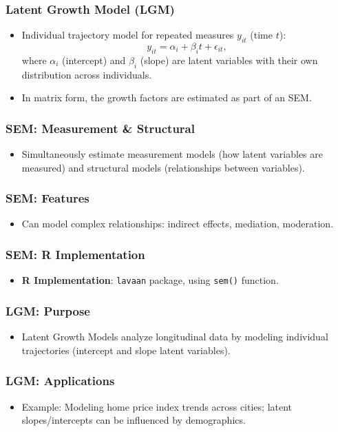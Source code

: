 \documentclass{beamer}
\newcommand{\code}[1]{\texttt{#1}}
\begin{document}
\begin{frame}
    \frametitle{Latent Growth Model (LGM)}
    \begin{itemize}
        \item Individual trajectory model for repeated measures $y_{it}$ (time $t$):
        \[y_{it}=\alpha_i+\beta_i t+\epsilon_{it},\]
        where $\alpha_i$ (intercept) and $\beta_i$ (slope) are latent variables with their own distribution across individuals.
        \item In matrix form, the growth factors are estimated as part of an SEM.
    \end{itemize}
\end{frame}

\begin{frame}
    \frametitle{SEM: Measurement \& Structural}
    \begin{itemize}
        \item Simultaneously estimate measurement models (how latent variables are measured) and structural models (relationships between variables).
    \end{itemize}
\end{frame}

\begin{frame}
    \frametitle{SEM: Features}
    \begin{itemize}
        \item Can model complex relationships: indirect effects, mediation, moderation.
    \end{itemize}
\end{frame}

\begin{frame}
    \frametitle{SEM: R Implementation}
    \begin{itemize}
        \item \textbf{R Implementation}: \code{lavaan} package, using \code{sem()} function.
    \end{itemize}
\end{frame}

\begin{frame}
    \frametitle{LGM: Purpose}
    \begin{itemize}
        \item Latent Growth Models analyze longitudinal data by modeling individual trajectories (intercept and slope latent variables).
    \end{itemize}
\end{frame}

\begin{frame}
    \frametitle{LGM: Applications}
    \begin{itemize}
        \item Example: Modeling home price index trends across cities; latent slopes/intercepts can be influenced by demographics.
    \end{itemize}
\end{frame}
\end{document}
